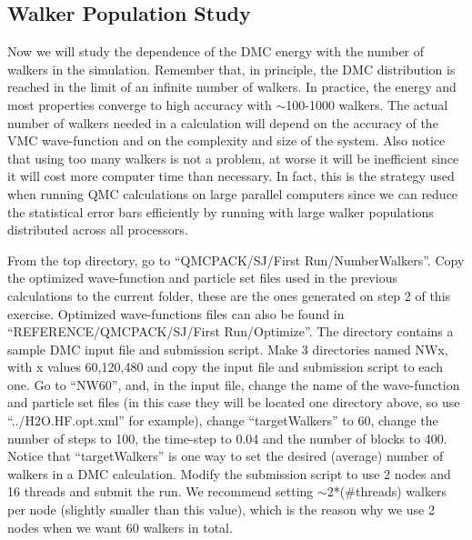 \subsection{Walker Population Study}
Now we will study the dependence of the DMC energy with the number of walkers in the
simulation. Remember that, in principle, the DMC distribution is reached in the limit of
an infinite number of walkers. In practice, the energy and most properties converge to high
accuracy with $\sim$100-1000 walkers. The actual number of walkers needed in a calculation
will depend on the accuracy of the VMC wave-function and on the complexity and size of
the system. Also notice that using too many walkers is not a problem, at worse it will be
inefficient since it will cost more computer time than necessary. In fact, this is the strategy
used when running QMC calculations on large parallel computers since we can reduce the
statistical error bars efficiently by running with large walker populations distributed across
all processors.

From the top directory, go to ``QMCPACK/SJ/First Run/NumberWalkers''. Copy the
optimized wave-function and particle set files used in the previous calculations to the current
folder, these are the ones generated on step 2 of this exercise. Optimized wave-functions files
can also be found in ``REFERENCE/QMCPACK/SJ/First Run/Optimize''. The directory
contains a sample DMC input file and submission script. Make 3 directories named NWx,
with x values 60,120,480 and copy the input file and submission script to each one. Go
to ``NW60'', and, in the input file, change the name of the wave-function and particle set
files (in this case they will be located one directory above, so use ``../H2O.HF.opt.xml'' for
example), change ``targetWalkers'' to 60, change the number of steps to 100, the time-step
to 0.04 and the number of blocks to 400. Notice that ``targetWalkers'' is one way to set the
desired (average) number of walkers in a DMC calculation. Modify the submission script
to use 2 nodes and 16 threads and submit the run. We recommend setting $\sim$2*(\#threads)
walkers per node (slightly smaller than this value), which is the reason why we use 2 nodes
when we want 60 walkers in total.

